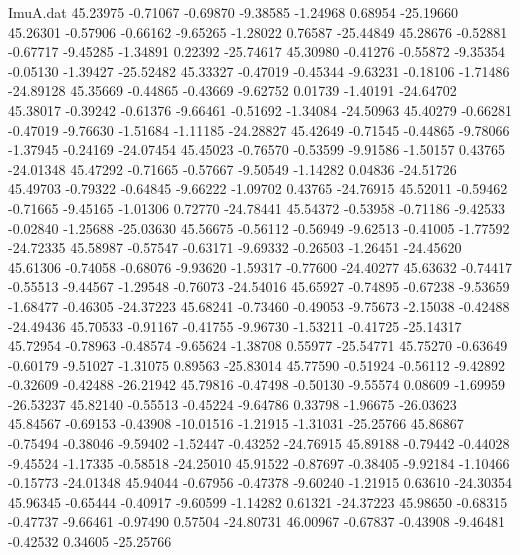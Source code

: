 \begin{filecontents}{ImuA.dat}
  45.23975   -0.71067   -0.69870   -9.38585   -1.24968    0.68954  -25.19660
  45.26301   -0.57906   -0.66162   -9.65265   -1.28022    0.76587  -25.44849
  45.28676   -0.52881   -0.67717   -9.45285   -1.34891    0.22392  -25.74617
  45.30980   -0.41276   -0.55872   -9.35354   -0.05130   -1.39427  -25.52482
  45.33327   -0.47019   -0.45344   -9.63231   -0.18106   -1.71486  -24.89128
  45.35669   -0.44865   -0.43669   -9.62752    0.01739   -1.40191  -24.64702
  45.38017   -0.39242   -0.61376   -9.66461   -0.51692   -1.34084  -24.50963
  45.40279   -0.66281   -0.47019   -9.76630   -1.51684   -1.11185  -24.28827
  45.42649   -0.71545   -0.44865   -9.78066   -1.37945   -0.24169  -24.07454
  45.45023   -0.76570   -0.53599   -9.91586   -1.50157    0.43765  -24.01348
  45.47292   -0.71665   -0.57667   -9.50549   -1.14282    0.04836  -24.51726
  45.49703   -0.79322   -0.64845   -9.66222   -1.09702    0.43765  -24.76915
  45.52011   -0.59462   -0.71665   -9.45165   -1.01306    0.72770  -24.78441
  45.54372   -0.53958   -0.71186   -9.42533   -0.02840   -1.25688  -25.03630
  45.56675   -0.56112   -0.56949   -9.62513   -0.41005   -1.77592  -24.72335
  45.58987   -0.57547   -0.63171   -9.69332   -0.26503   -1.26451  -24.45620
  45.61306   -0.74058   -0.68076   -9.93620   -1.59317   -0.77600  -24.40277
  45.63632   -0.74417   -0.55513   -9.44567   -1.29548   -0.76073  -24.54016
  45.65927   -0.74895   -0.67238   -9.53659   -1.68477   -0.46305  -24.37223
  45.68241   -0.73460   -0.49053   -9.75673   -2.15038   -0.42488  -24.49436
  45.70533   -0.91167   -0.41755   -9.96730   -1.53211   -0.41725  -25.14317
  45.72954   -0.78963   -0.48574   -9.65624   -1.38708    0.55977  -25.54771
  45.75270   -0.63649   -0.60179   -9.51027   -1.31075    0.89563  -25.83014
  45.77590   -0.51924   -0.56112   -9.42892   -0.32609   -0.42488  -26.21942
  45.79816   -0.47498   -0.50130   -9.55574    0.08609   -1.69959  -26.53237
  45.82140   -0.55513   -0.45224   -9.64786    0.33798   -1.96675  -26.03623
  45.84567   -0.69153   -0.43908  -10.01516   -1.21915   -1.31031  -25.25766
  45.86867   -0.75494   -0.38046   -9.59402   -1.52447   -0.43252  -24.76915
  45.89188   -0.79442   -0.44028   -9.45524   -1.17335   -0.58518  -24.25010
  45.91522   -0.87697   -0.38405   -9.92184   -1.10466   -0.15773  -24.01348
  45.94044   -0.67956   -0.47378   -9.60240   -1.21915    0.63610  -24.30354
  45.96345   -0.65444   -0.40917   -9.60599   -1.14282    0.61321  -24.37223
  45.98650   -0.68315   -0.47737   -9.66461   -0.97490    0.57504  -24.80731
  46.00967   -0.67837   -0.43908   -9.46481   -0.42532    0.34605  -25.25766

\end{filecontents}
